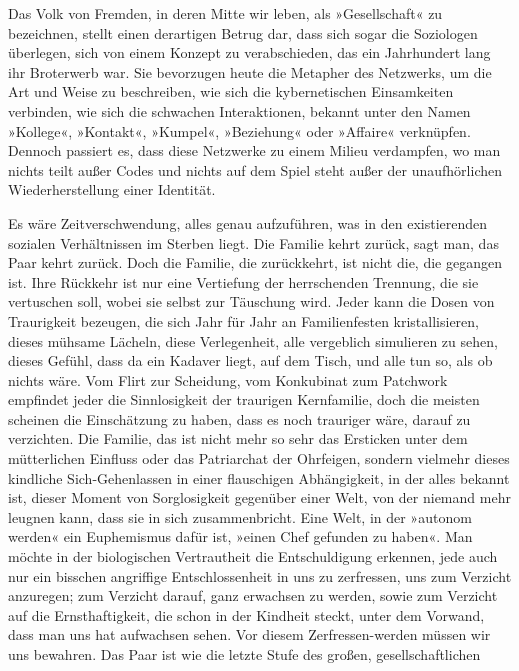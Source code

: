 \extrapar{}

Das Volk von Fremden, in deren Mitte wir leben, als »Gesellschaft«
zu bezeichnen, stellt einen derartigen Betrug dar, dass sich sogar
die Soziologen überlegen, sich von einem Konzept zu verabschieden,
das ein Jahrhundert lang ihr Broterwerb war. Sie bevorzugen heute
die Metapher des Netzwerks, um die Art und Weise zu beschreiben,
wie sich die kybernetischen Einsamkeiten verbinden, wie sich die
schwachen Interaktionen, bekannt unter den Namen »Kollege«,
»Kontakt«, »Kumpel«, »Beziehung« oder »Affaire« verknüpfen. Dennoch
passiert es, dass diese Netzwerke zu einem Milieu verdampfen, wo
man nichts teilt außer Codes und nichts auf dem Spiel steht außer
der unaufhörlichen Wiederherstellung einer Identität.
\extrapar{}

Es wäre Zeitverschwendung, alles genau aufzuführen, was in den
existierenden sozialen Verhältnissen im Sterben liegt. Die Familie
kehrt zurück, sagt man, das Paar kehrt zurück. Doch die Familie,
die zurückkehrt, ist nicht die, die gegangen ist. Ihre Rückkehr ist
nur eine Vertiefung der herrschenden Trennung, die sie vertuschen
soll, wobei sie selbst zur Täuschung wird. Jeder kann die Dosen von
Traurigkeit bezeugen, die sich Jahr für Jahr an Familienfesten
kristallisieren, dieses mühsame Lächeln, diese Verlegenheit, alle
vergeblich simulieren zu sehen, dieses Gefühl, dass da ein Kadaver
liegt, auf dem Tisch, und alle tun so, als ob nichts wäre. Vom
Flirt zur Scheidung, vom Konkubinat zum Patchwork empfindet jeder
die Sinnlosigkeit der traurigen Kernfamilie, doch die meisten
scheinen die Einschätzung zu haben, dass es noch trauriger wäre,
darauf zu verzichten. Die Familie, das ist nicht mehr so sehr das
Ersticken unter dem mütterlichen Einfluss oder das Patriarchat der
Ohrfeigen, sondern vielmehr dieses kindliche Sich-Gehenlassen in
einer flauschigen Abhängigkeit, in der alles bekannt ist, dieser
Moment von Sorglosigkeit gegenüber einer Welt, von der niemand mehr
leugnen kann, dass sie in sich zusammenbricht. Eine Welt, in der
»autonom werden« ein Euphemismus dafür ist, »einen Chef gefunden zu
haben«. Man möchte in der biologischen Vertrautheit die
Entschuldigung erkennen, jede auch nur ein bisschen angriffige
Entschlossenheit in uns zu zerfressen, uns zum Verzicht anzuregen;
zum Verzicht darauf, ganz erwachsen zu werden, sowie zum Verzicht
auf die Ernsthaftigkeit, die schon in der Kindheit steckt, unter
dem Vorwand, dass man uns hat aufwachsen sehen. Vor diesem
Zerfressen-werden müssen wir uns bewahren.
Das Paar ist wie die letzte Stufe des großen, gesellschaftlichen
